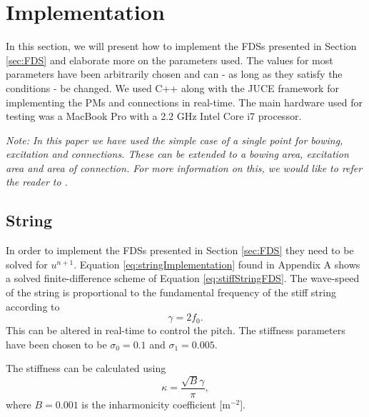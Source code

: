 \documentclass{article}
\begin{document}
\section{Implementation}\label{sec:implementation}
In this section, we will present how to implement the FDSs presented in Section \ref{sec:FDS} and elaborate more on the parameters used. The values for most parameters have been arbitrarily chosen and can - as long as they satisfy the conditions - be changed. We used C++ along with the JUCE framework for implementing the PMs and connections in real-time. The main hardware used for testing was a MacBook Pro with a 2.2 GHz Intel Core i7 processor.

\textit{Note: In this paper we have used the simple case of a single point for bowing, excitation and connections. These can be extended to a bowing area, excitation area and area of connection. For more information on this, we would like to refer the reader to \cite{Bilbao2009:ModularPercussion}}.

\subsection{String}
In order to implement the FDSs presented in Section \ref{sec:FDS} they need to be solved for $u^{n+1}$. Equation \eqref{eq:stringImplementation} found in Appendix A shows a solved finite-difference scheme of Equation \eqref{eq:stiffStringFDS}.
The wave-speed of the string is proportional to the fundamental frequency of the stiff string according to
\begin{equation}
    \gamma = 2 f_0.
\end{equation}
This can be altered in real-time to control the pitch.
The stiffness parameters have been chosen to be $\sigma_0 = 0.1$ and $\sigma_1 = 0.005$. 


The stiffness can be calculated using
\begin{equation}
    \kappa = \frac{\sqrt{B}\gamma}{\pi},
\end{equation}
where $B = 0.001$ is the inharmonicity coefficient [m$^{-2}$].
\end{document}
